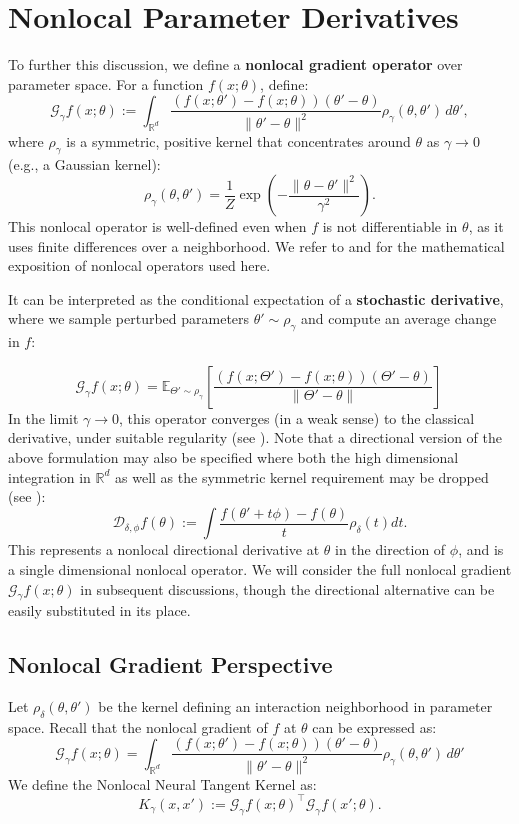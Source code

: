 \documentclass[11pt]{article}
\theoremstyle{plain}
\begin{document}
\section{Nonlocal Parameter Derivatives}

To further this discussion, we define a \textbf{nonlocal gradient operator} over parameter space. For a function \( f(x; \theta) \), define:
\[
\mathcal{G}_\gamma f(x; \theta) := \int_{\mathbb{R}^d}   \frac{(f(x; \theta') - f(x; \theta))(\theta' - \theta)}{\|\theta' - \theta\|^2} \rho_\gamma(\theta, \theta')\, d\theta',
\]
where \( \rho_\gamma \) is a symmetric, positive kernel that concentrates around \( \theta \) as \( \gamma \to 0 \) (e.g., a Gaussian kernel):
\[
\rho_\gamma(\theta, \theta') = \frac{1}{Z} \exp\left( -\frac{\|\theta - \theta'\|^2}{\gamma^2} \right).
\]
This nonlocal operator is well-defined even when \( f \) is not differentiable in \( \theta \), as it uses finite differences over a neighborhood. We refer to \cite{du} and \cite{mengesha} for the mathematical exposition of nonlocal operators used here.

It can be interpreted as the conditional expectation of a \textbf{stochastic  derivative}, where we sample perturbed parameters \( \theta' \sim \rho_\gamma \) and compute an average change in \( f \):

\[
\mathcal{G}_\gamma f(x; \theta) = \mathbb{E}_{\Theta'\sim \rho_\gamma}[\frac{(f(x; \Theta') - f(x; \theta))(\Theta' - \theta)}{\|\Theta' - \theta\|}] \,
\]
 In the limit \( \gamma \to 0 \), this operator converges (in a weak sense) to the classical derivative, under suitable regularity (see \cite{mengesha, du}).
 Note that a directional version of the above formulation may also be specified where both the high dimensional integration in $\mathbb{R}^d$ as well as the symmetric kernel requirement may be dropped (see \cite{nagaraj24}):
\[
\mathcal{D}_{\delta,\phi} f(\theta) := \int \frac{f(\theta'+t\phi) - f(\theta)}{t} \rho_\delta(t) dt.
\]
This represents a nonlocal directional derivative at $\theta$ in the direction of $\phi$, and is a single dimensional nonlocal operator. We will consider the full nonlocal gradient $\mathcal{G}_\gamma f(x; \theta)$ in subsequent discussions, though the directional alternative can be easily substituted in its place.
\subsection{Nonlocal Gradient Perspective}
Let $\rho_\delta(\theta, \theta')$ be the kernel defining an interaction neighborhood in parameter space. Recall that the nonlocal gradient of $f$ at $\theta$ can be expressed as:
\[
\mathcal{G}_\gamma f(x; \theta) = \int_{\mathbb{R}^d}   \frac{(f(x; \theta') - f(x; \theta))(\theta' - \theta)}{\|\theta' - \theta\|^2} \rho_\gamma(\theta, \theta')\, d\theta'
\]
We define the Nonlocal Neural Tangent Kernel as:
\[
K_\gamma(x, x') := \mathcal{G}_\gamma f(x; \theta)^\top \mathcal{G}_\gamma f(x'; \theta).
\]
\end{document}
